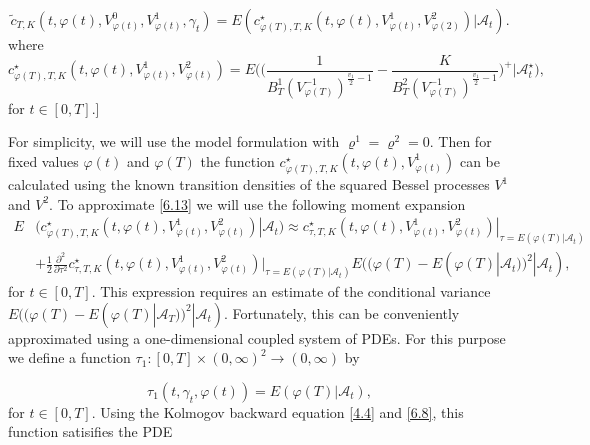 \documentclass[a4 paper, 12pt]{report}
\theoremstyle{plain}
\begin{document}
\begin{equation}\label{6.13}
\tilde{c}_{T,K}(t,\varphi(t), V^0_{\varphi(t)}, V^1_{\varphi(t)},\gamma_t) = E(c^\star_{\varphi(T),T,K}(t,\varphi(t),V^1_{\varphi(t)},V^2_{\varphi(2)})|\mathcal{A}_t).   
\end{equation}
where
\begin{equation}\label{6.14}
c^\star_{\varphi(T),T,K}(t,\varphi(t), V^1_{\varphi(t)}, V^2_{\varphi(t)}) = E\bigg(\bigg(\frac{1}{B_T^1(V^{-1}_{\varphi(T)})^{\frac{v_1}{2} - 1}} - \frac{K}{B_T^2(V^{-1}_{\varphi(T)})^{\frac{v_1}{2} - 1}}\bigg)^+\bigg|\mathcal{A}_t^\star\bigg), 
\end{equation}
for $t\in[0,T]$.]\\
\par For simplicity, we will use the model formulation with $\varrho^1 = \varrho^2 = 0$. Then for fixed values $\varphi(t)$ and $\varphi(T)$ the function $c^\star_{\varphi(T),T,K}(t,\varphi(t),V^1_{\varphi(t)})$ can be calculated using the known transition densities of the squared Bessel processes $V^1$ and $V^2$. To approximate \eqref{6.13} we will use the following moment expansion
\begin{equation}\label{6.15}
\begin{split}
E&(c^\star_{\varphi(T),T,K}(t,\varphi(t),V^1_{\varphi(t)},V^2_{\varphi(t)})|\mathcal{A}_t) \approx c^\star_{\tau,T,K}(t,\varphi(t),V^1_{\varphi(t)},V^2_{\varphi(t)})|_{\tau = E(\varphi(T)|\mathcal{A}_t)}\\
&+\frac{1}{2}\frac{\partial^2}{\partial \tau^2}c^\star_{\tau,T,K}(t,\varphi(t), V^1_{\varphi(t)}, V^2_{\varphi(t)})|_{\tau = E(\varphi(T)|\mathcal{A}_t)}E((\varphi(T) - E(\varphi(T)|\mathcal{A}_t))^2|\mathcal{A}_t),
\end{split}
\end{equation}
for $t\in[0,T]$. This expression requires an estimate of the conditional variance $E((\varphi(T) - E(\varphi(T)|\mathcal{A}_T))^2|\mathcal{A}_t)$. Fortunately, this can be conveniently approximated using a one-dimensional coupled system of PDEs. For this purpose we define a function $\tau_1:[0,T]\times (0,\infty)^2\rightarrow (0,\infty)$ by

\begin{equation}\label{6.16}
\tau_1(t,\gamma_t,\varphi(t)) = E(\varphi(T)|\mathcal{A}_t),
\end{equation}
for $t\in[0,T]$. Using the Kolmogov backward equation \eqref{4.4} and \eqref{6.8}, this function satisifies the PDE
\end{document}
